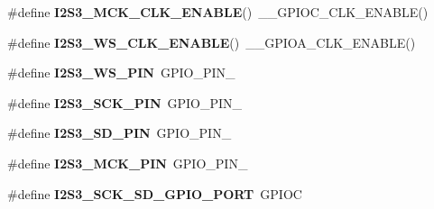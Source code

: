 \begin{DoxyCompactItemize}
\#define {\bfseries I2\+S3\+\_\+\+M\+C\+K\+\_\+\+C\+L\+K\+\_\+\+E\+N\+A\+B\+LE}()~\+\_\+\+\_\+\+G\+P\+I\+O\+C\+\_\+\+C\+L\+K\+\_\+\+E\+N\+A\+B\+LE()
\item 
\mbox{\label{group___s_t_m32_f4___d_i_s_c_o_v_e_r_y___a_u_d_i_o___o_u_t___exported___constants_ga2a533a31a797a1b2cd547f6d5d2963a0}} 
\#define {\bfseries I2\+S3\+\_\+\+W\+S\+\_\+\+C\+L\+K\+\_\+\+E\+N\+A\+B\+LE}()~\+\_\+\+\_\+\+G\+P\+I\+O\+A\+\_\+\+C\+L\+K\+\_\+\+E\+N\+A\+B\+LE()
\item 
\mbox{\label{group___s_t_m32_f4___d_i_s_c_o_v_e_r_y___a_u_d_i_o___o_u_t___exported___constants_ga5a53a9e65b1aef168f7d508379ced23a}} 
\#define {\bfseries I2\+S3\+\_\+\+W\+S\+\_\+\+P\+IN}~G\+P\+I\+O\+\_\+\+P\+I\+N\+\_
\item 
\mbox{\label{group___s_t_m32_f4___d_i_s_c_o_v_e_r_y___a_u_d_i_o___o_u_t___exported___constants_ga0ebd2f943ae225b13b5e876f31bc80be}} 
\#define {\bfseries I2\+S3\+\_\+\+S\+C\+K\+\_\+\+P\+IN}~G\+P\+I\+O\+\_\+\+P\+I\+N\+\_
\item 
\mbox{\label{group___s_t_m32_f4___d_i_s_c_o_v_e_r_y___a_u_d_i_o___o_u_t___exported___constants_gac72d60d4f79324952aba7bd0df99bd0e}} 
\#define {\bfseries I2\+S3\+\_\+\+S\+D\+\_\+\+P\+IN}~G\+P\+I\+O\+\_\+\+P\+I\+N\+\_
\item 
\mbox{\label{group___s_t_m32_f4___d_i_s_c_o_v_e_r_y___a_u_d_i_o___o_u_t___exported___constants_ga6344760191b75388d61b5edf138275de}} 
\#define {\bfseries I2\+S3\+\_\+\+M\+C\+K\+\_\+\+P\+IN}~G\+P\+I\+O\+\_\+\+P\+I\+N\+\_
\item 
\mbox{\label{group___s_t_m32_f4___d_i_s_c_o_v_e_r_y___a_u_d_i_o___o_u_t___exported___constants_gaaf5937e9d1856fa879027af4a04425b2}} 
\#define {\bfseries I2\+S3\+\_\+\+S\+C\+K\+\_\+\+S\+D\+\_\+\+G\+P\+I\+O\+\_\+\+P\+O\+RT}~G\+P\+I\+OC

\end{DoxyCompactItemize}
